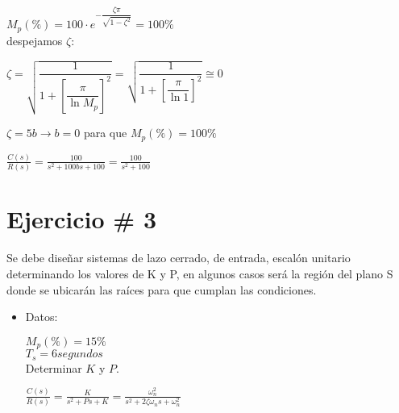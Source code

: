 \documentclass[12pt]{article}
\begin{document}
\begin{enumerate}
    \( \displaystyle M_p(\%) = 100\cdot e^{- \dfrac{\zeta \pi}{\sqrt{1 - \zeta^{2}}}} = 100\% \)\\
    
    despejamos $\zeta$:

    \( \displaystyle \zeta = \sqrt{\dfrac{1}{1+ \left [ \dfrac{\pi}{\ln{M_{p}}} \right ]^{2} }} 
    = \sqrt{\dfrac{1}{1+ \left [ \dfrac{\pi}{\ln{1}} \right ]^{2} }} \cong 0 \)

    \( \displaystyle \zeta = 5b \rightarrow b=0 \) para que $M_{p}(\%)=100\%$

    \( \displaystyle \frac{C(s)}{R(s)} = \frac{100}{s^2 + 100bs + 100} = \frac{100}{s^2 + 100} \)

    \newpage

    \section*{Ejercicio \# 3}


    Se debe dise\~nar sistemas de lazo cerrado, de entrada, escal\'on unitario
    determinando los valores de K y P, en algunos casos ser\'a la regi\'on del
    plano S donde se ubicar\'an las ra\'ices para que cumplan las condiciones.

    \vspace{1cm}


    \begin{itemize}
      \item Datos:

        \( \displaystyle M_{p}(\%) = 15\% \)\\
        \( \displaystyle T_{s} = 6 segundos \)\\
        Determinar $K$ y $P$.

    \vspace{1cm}

    \( \displaystyle \frac{C(s)}{R(s)} = \frac{K}{s^2 + Ps + K} = \frac{\omega_{n}^{2}}{s^2 + 2\zeta \omega_{n}s + \omega_{n}^{2}} \)


\end{itemize}
\end{enumerate}
\end{document}
